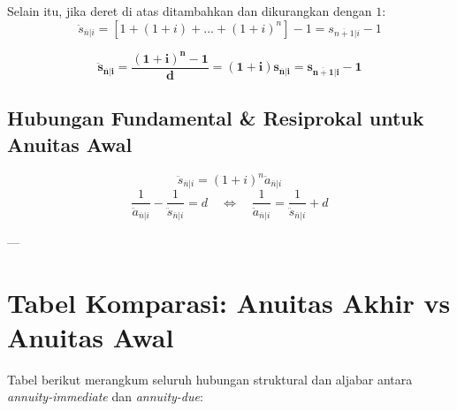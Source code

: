 \documentclass[11pt,a4paper]{article}
\begin{document}
Selain itu, jika deret di atas ditambahkan dan dikurangkan dengan $1$:
\begin{equation}
    \ddot{s}_{\overline{n}|i} = \left[ 1 + (1+i) + \dots + (1+i)^n \right] - 1 = s_{\overline{n+1}|i} - 1
\end{equation}

\begin{definitionbox}
\begin{equation}
    \mathbf{\ddot{s}_{\overline{n}|i} = \frac{(1+i)^n - 1}{d} = (1+i) s_{\overline{n}|i} = s_{\overline{n+1}|i} - 1}
\end{equation}
\end{definitionbox}

\subsection{Hubungan Fundamental \& Resiprokal untuk Anuitas Awal}
\begin{equation}
    \ddot{s}_{\overline{n}|i} = (1+i)^n \ddot{a}_{\overline{n}|i}
\end{equation}
\begin{equation}
    \frac{1}{\ddot{a}_{\overline{n}|i}} - \frac{1}{\ddot{s}_{\overline{n}|i}} = d \quad \iff \quad \frac{1}{\ddot{a}_{\overline{n}|i}} = \frac{1}{\ddot{s}_{\overline{n}|i}} + d
\end{equation}

---

\section{Tabel Komparasi: Anuitas Akhir vs Anuitas Awal}

Tabel berikut merangkum seluruh hubungan struktural dan aljabar antara \textit{annuity-immediate} dan \textit{annuity-due}:
\end{document}
